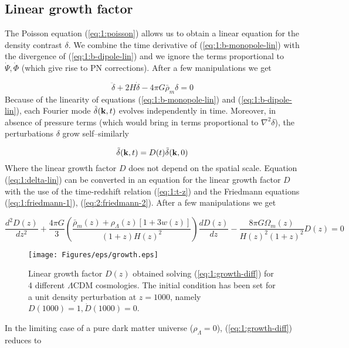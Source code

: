 \subsection{Linear growth factor}
The Poisson equation (\ref{eq:1:poisson}) allows us to obtain a linear equation for the density contrast $\delta$. We combine the time derivative of (\ref{eq:1:b-monopole-lin}) with the divergence of (\ref{eq:1:b-dipole-lin}) and we ignore the terms proportional to $\dot{\Psi},\dot{\Phi}$ (which give rise to PN corrections). After a few manipulations we get 

\begin{equation}
\label{eq:1:delta-lin}
\ddot{\delta} + 2H\dot{\delta} - 4\pi G\bar{\rho}_m\delta = 0  
\end{equation} 
%
Because of the linearity of equations (\ref{eq:1:b-monopole-lin}) and (\ref{eq:1:b-dipole-lin}), each Fourier mode $\tilde{\delta}(\mathbf{k},t)$ evolves independently in time. Moreover, in absence of pressure terms (which would bring in terms proportional to $\nabla^2\delta$), the perturbations $\delta$ grow self--similarly

\begin{equation}
\label{eq:1:selfsim}
\tilde{\delta}(\mathbf{k},t) = D(t)\tilde{\delta}(\mathbf{k},0)
\end{equation}
%
Where the linear growth factor $D$ does not depend on the spatial scale. Equation (\ref{eq:1:delta-lin}) can be converted in an equation for the linear growth factor $D$ with the use of the time-redshift relation (\ref{eq:1:t-z}) and the Friedmann equations (\ref{eq:1:friedmann-1}), (\ref{eq:2:friedmann-2}). After a few manipulations we get

\begin{equation}
\label{eq:1:growth-diff}
\frac{d^2D(z)}{dz^2} + \frac{4\pi G}{3}\left(\frac{\bar{\rho}_m(z)+\rho_\Lambda(z)[1+3w(z)]}{(1+z)H(z)^2}\right)\frac{dD(z)}{dz}-\frac{8\pi G\Omega_m(z)}{H(z)^2(1+z)^2}D(z)= 0
\end{equation}
%
\begin{figure}
\begin{center}
\texttt{[image: Figures/eps/growth.eps]}
\end{center}
\caption{Linear growth factor $D(z)$ obtained solving (\ref{eq:1:growth-diff}) for 4 different $\Lambda$CDM cosmologies. The initial condition has been set for a unit density perturbation at $z=1000$, namely $D(1000)=1, \dot{D}(1000)=0$.}
\label{fig:1:growth}
\end{figure}
%
In the limiting case of a pure dark matter universe ($\rho_\Lambda=0$), (\ref{eq:1:growth-diff}) reduces to

